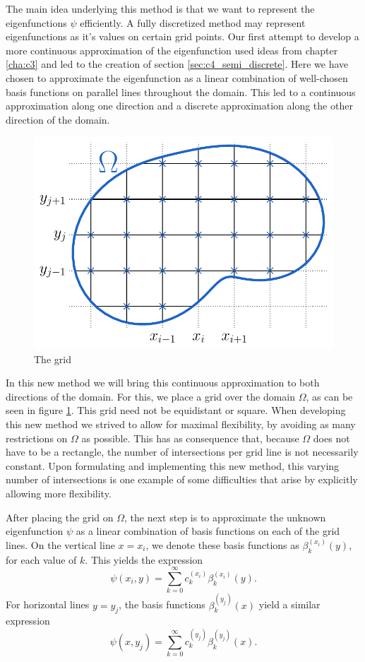 The main idea underlying this method is that we want to represent the eigenfunctions $\psi$ efficiently. A fully discretized method may represent eigenfunctions as it's values on certain grid points. Our first attempt to develop a more continuous approximation of the eigenfunction used ideas from chapter \ref{cha:c3} and led to the creation of section \ref{sec:c4_semi_discrete}. Here we have chosen to approximate the eigenfunction as a linear combination of well-chosen basis functions on parallel lines throughout the domain. This led to a continuous approximation along one direction and a discrete approximation along the other direction of the domain.

\begin{figure}
    \begin{center}
        \includegraphics[width=.8\linewidth]{img/chapter4/the_method_grid.pdf}
        \caption{\label{fig:woven_method_grid} The grid}
    \end{center}
\end{figure}

In this new method we will bring this continuous approximation to both directions of the domain. For this, we place a grid over the domain $\Omega$, as can be seen in figure \ref{fig:woven_method_grid}. This grid need not be equidistant or square. When developing this new method we strived to allow for maximal flexibility, by avoiding as many restrictions on $\Omega$ as possible. This has as consequence that, because $\Omega$ does not have to be a rectangle, the number of intersections per grid line is not necessarily constant. Upon formulating and implementing this new method, this varying number of intersections is one example of some difficulties that arise by explicitly allowing more flexibility.

After placing the grid on $\Omega$, the next step is to approximate the unknown eigenfunction $\psi$ as a linear combination of basis functions on each of the grid lines. On the vertical line $x = x_i$, we denote these basis functions as $\beta_k^{(x_i)}(y)$, for each value of $k$. This yields the expression
$$
    \psi(x_i, y) = \sum_{k=0}^\infty c_k^{(x_i)} \beta_k^{(x_i)}(y) \text{.}
$$
For horizontal lines $y = y_j$, the basis functions $\beta_k^{(y_j)}(x)$ yield a similar expression
$$
    \psi(x, y_j) = \sum_{k=0}^\infty c_k^{(y_j)} \beta_k^{(y_j)}(x) \text{.}
$$

